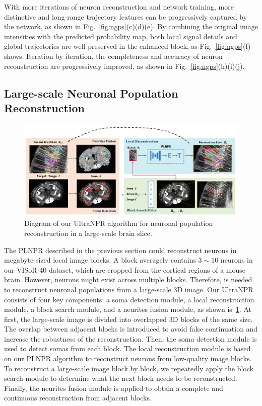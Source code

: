 With more iterations of neuron reconstruction and network training, more distinctive and long-range trajectory features can be progressively captured by the network, as shown in Fig.~\ref{fig:ngps}(c)(d)(e).
By combining the original image intensities with the predicted probability map, both local signal details and global trajectories are well preserved in the enhanced block, as Fig.~\ref{fig:ngps}(f) shows.
Iteration by iteration, the completeness and accuracy of neuron reconstruction are progressively improved, as shown in Fig.~\ref{fig:ngps}(h)(i)(j).




\subsection{Large-scale Neuronal Population Reconstruction}
\label{sec:UltraNPR}

\begin{figure}[th]
	\centering
	\includegraphics[width=1\textwidth]{./Illustrations/framework_ultranpr.PNG}
	\caption{Diagram of our UltraNPR algorithm for neuronal population reconstruction in a large-scale brain slice.}
	\label{fig:ultra_framework}
\end{figure}

The PLNPR described in the previous section could reconstruct neurons in megabyte-sized local image blocks. A block averagely contains $ 3\sim10 $ neurons in our VISoR-40 dataset, which are cropped from the cortical regions of a mouse brain. However, neurons might exist across multiple blocks. Therefore,  is needed to reconstruct neuronal populations from a large-scale 3D image. 
%
Our UltraNPR consists of four key components: a soma detection module, a local reconstruction module, a block search module, and a neurites fusion module, as shown is~\ref{fig:ultra_framework}.
At first, the large-scale image is divided into overlapped 3D blocks of the same size. 
The overlap between adjacent blocks is introduced to avoid false continuation and increase the robustness of the reconstruction.
Then, the soma detection module is used to detect somas from each block.
The local reconstruction module is based on our PLNPR algorithm to reconstruct neurons from low-quality image blocks.
To reconstruct a large-scale image block by block,  we repeatedly apply the block search module to determine what the next block needs to be reconstructed. 
Finally, the neurites fusion module is applied to obtain a complete and continuous reconstruction from adjacent blocks.


